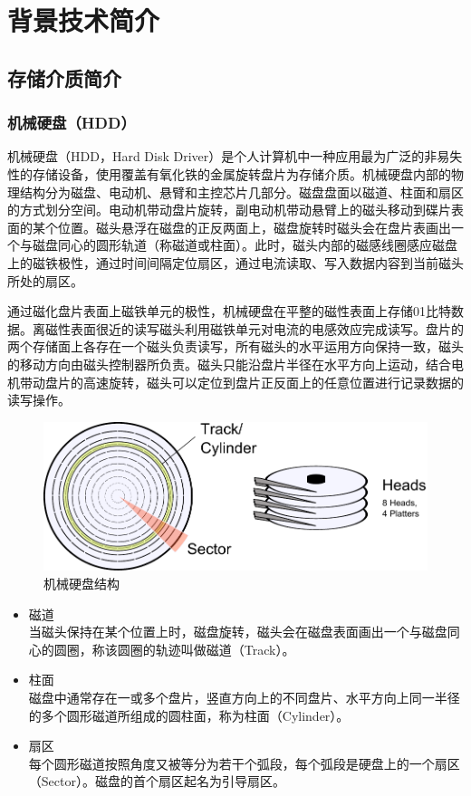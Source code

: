 
\chapter{背景技术简介}
\label{cha:related_work}

\section{存储介质简介}

\subsection{机械硬盘（HDD）}
机械硬盘\cite{hdd2009}（HDD，Hard Disk Driver）是个人计算机中一种应用最为广泛的非易失性的存储设备，使用覆盖有氧化铁的金属旋转盘片为存储介质。机械硬盘内部的物理结构分为磁盘、电动机、悬臂和主控芯片几部分。磁盘盘面以磁道、柱面和扇区的方式划分空间。电动机带动盘片旋转，副电动机带动悬臂上的磁头移动到碟片表面的某个位置。磁头悬浮在磁盘的正反两面上，磁盘旋转时磁头会在盘片表画出一个与磁盘同心的圆形轨道（称磁道或柱面）。此时，磁头内部的磁感线圈感应磁盘上的磁铁极性，通过时间间隔定位扇区，通过电流读取、写入数据内容到当前磁头所处的扇区。

通过磁化盘片表面上磁铁单元的极性，机械硬盘在平整的磁性表面上存储01比特数据。离磁性表面很近的读写磁头利用磁铁单元对电流的电感效应完成读写。盘片的两个存储面上各存在一个磁头负责读写，所有磁头的水平运用方向保持一致，磁头的移动方向由磁头控制器所负责。磁头只能沿盘片半径在水平方向上运动，结合电机带动盘片的高速旋转，磁头可以定位到盘片正反面上的任意位置进行记录数据的读写操作。

\begin{figure}[H]
\centering
\includegraphics[width=0.6\linewidth]{./graph/hdd-struct}
\caption{机械硬盘结构}
\label{fig:hdd-struct}
\end{figure}

\begin{itemize}
\item 磁道
\\当磁头保持在某个位置上时，磁盘旋转，磁头会在磁盘表面画出一个与磁盘同心的圆圈，称该圆圈的轨迹叫做磁道（Track）。
\item 柱面
\\磁盘中通常存在一或多个盘片，竖直方向上的不同盘片、水平方向上同一半径的多个圆形磁道所组成的圆柱面，称为柱面（Cylinder）。
\item 扇区
\\每个圆形磁道按照角度又被等分为若干个弧段，每个弧段是硬盘上的一个扇区（Sector）。磁盘的首个扇区起名为引导扇区。
\end{itemize}

